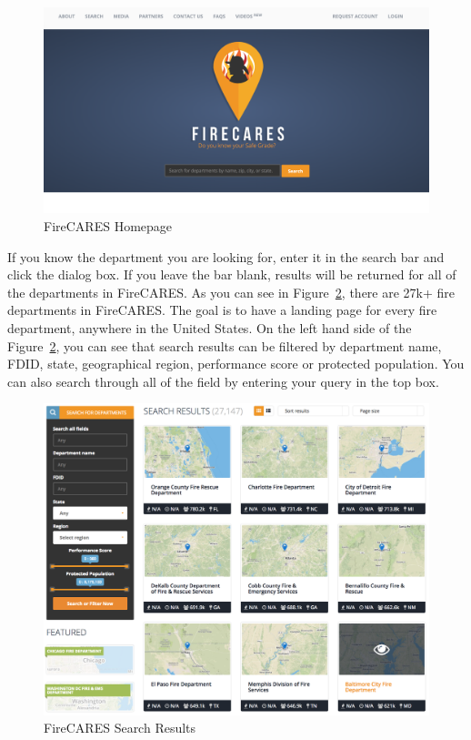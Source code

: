 \documentclass[12pt,oneside]{book}
\begin{document}
\begin{figure}[ht!]
\centering
\includegraphics[width=.9\columnwidth]{Figures/homepage}
\caption{FireCARES Homepage}
\label{fig:homepage}
\end{figure}

If you know the department you are looking for, enter it in the search bar and click the dialog box. If you leave the bar blank, results will be returned for all of the departments in FireCARES. As you can see in Figure~\ref{fig:search}, there are 27k+ fire departments in FireCARES. The goal is to have a landing page for every fire department, anywhere in the United States. On the left hand side of the Figure~\ref{fig:search}, you can see that search results can be filtered by department name, FDID, state, geographical region, performance score or protected population. You can also search through all of the field by entering your query in the top box.

\begin{figure}[ht!]
\centering
\includegraphics[width=.9\columnwidth]{Figures/search_results}
\caption{FireCARES Search Results}
\label{fig:search}
\end{figure}
\end{document}
